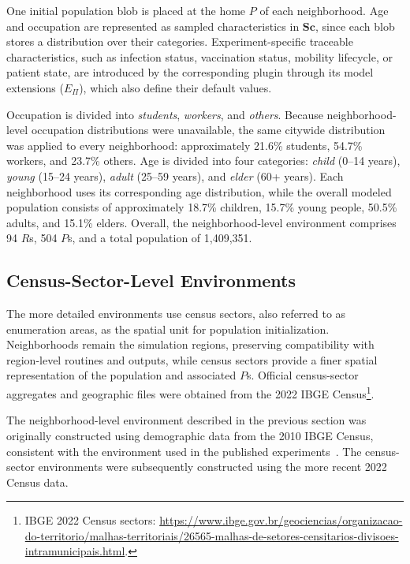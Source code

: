 One initial population blob is placed at the home $P$ of each neighborhood. Age and occupation are represented as sampled characteristics in $\bm{Sc}$, since each blob stores a distribution over their categories. Experiment-specific traceable characteristics, such as infection status, vaccination status, mobility lifecycle, or patient state, are introduced by the corresponding plugin through its model extensions ($E_{\Pi}$), which also define their
default values.

Occupation is divided into \textit{students}, \textit{workers}, and \textit{others}. Because neighborhood-level occupation distributions were unavailable, the same citywide distribution was applied to every neighborhood: approximately 21.6\% students, 54.7\% workers, and 23.7\% others. Age is divided into four categories: \textit{child} (0--14 years), \textit{young} (15--24 years), \textit{adult} (25--59 years), and \textit{elder} (60+ years). Each neighborhood uses its corresponding age distribution, while the overall modeled population consists of approximately 18.7\% children, 15.7\% young people, 50.5\% adults, and 15.1\% elders. Overall, the neighborhood-level environment comprises 94 $R$s, 504 $P$s, and a total population of 1,409,351.

\subsection{Census-Sector-Level Environments}
\label{sec:census_sector_environments}

The more detailed environments use census sectors, also referred to as enumeration areas, as the spatial unit for population initialization. Neighborhoods remain the simulation regions, preserving compatibility with region-level routines and outputs, while census sectors provide a finer spatial representation of the population and associated $P$s. Official census-sector aggregates and geographic files were obtained from the 2022 IBGE Census\footnote{IBGE 2022 Census sectors: \url{https://www.ibge.gov.br/geociencias/organizacao-do-territorio/malhas-territoriais/26565-malhas-de-setores-censitarios-divisoes-intramunicipais.html}.}.

The neighborhood-level environment described in the previous section was originally constructed using demographic data from the 2010 IBGE Census, consistent with the environment used in the published experiments~\cite{silva2026lodusPop}. The census-sector environments were subsequently constructed using the more recent 2022 Census data. %


